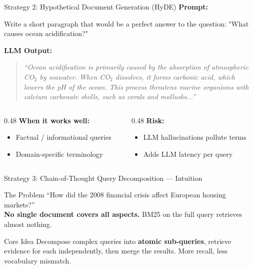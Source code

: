 \documentclass[aspectratio=169]{beamer}
\newif\ifanimated
\newcommand{\cpause}{\ifanimated\pause\fi}
\begin{document}
\begin{frame}[shrink=25]{Strategy 2: Hypothetical Document Generation (HyDE)}
\textbf{Prompt:}
\begin{tcolorbox}[colback=gray!10, colframe=gray!50, fontupper=\small\ttfamily]
Write a short paragraph that would be a perfect answer to the question: "What causes ocean acidification?"
\end{tcolorbox}

\vspace{0.3em}

\textbf{LLM Output:}
\begin{quote}
\small\itshape
``Ocean acidification is primarily caused by the absorption of atmospheric CO$_2$ by seawater. When CO$_2$ dissolves, it forms carbonic acid, which lowers the pH of the ocean. This process threatens marine organisms with calcium carbonate shells, such as corals and mollusks...''
\end{quote}

\cpause

\begin{columns}[T]
\begin{column}{0.48\textwidth}
\textcolor{irHybrid}{\checkmark} \textbf{When it works well:}
\begin{itemize}\small
    \item Factual / informational queries
    \item Domain-specific terminology
\end{itemize}
\end{column}
\begin{column}{0.48\textwidth}
\textcolor{irRerank}{} \textbf{Risk:}
\begin{itemize}\small
    \item LLM hallucinations pollute terms
    \item Adds LLM latency per query
\end{itemize}
\end{column}
\end{columns}
\end{frame}


\begin{frame}{Strategy 3: Chain-of-Thought Query Decomposition --- Intuition}
\begin{exampleblock}{The Problem}
``How did the 2008 financial crisis affect European housing markets?'' \\
\textbf{No single document covers all aspects.} BM25 on the full query retrieves almost nothing.
\end{exampleblock}

\vspace{0.5em}

\begin{block}{Core Idea}
Decompose complex queries into \textbf{atomic sub-queries}, retrieve evidence for each independently, then merge the results. More recall, less vocabulary mismatch.
\end{block}

\end{frame}
\end{document}
